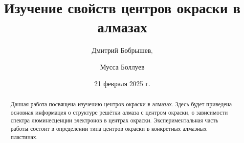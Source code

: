 \title{Изучение свойств центров окраски в алмазах}
\author{Дмитрий Бобрышев,}
\author{Мусса Боллуев}

\date{21 февраля 2025 г.}

\begin{abstract}
    Данная работа посвящена изучению центров окраски в алмазах. 
    Здесь будет приведена основная информация о структуре решётки алмаза
    с центром окраски, о зависимости 
    спектра люминесценции электронов в центрах окраски. Экспериментальная часть
    работы состоит в определении типа центров окраски в конкретных алмазных 
    пластинах.
\end{abstract}

